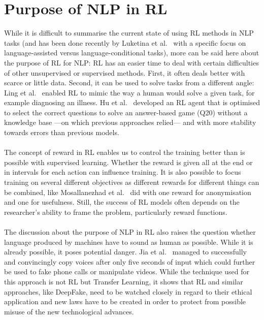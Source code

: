\documentclass[11pt]{article}
\begin{document}
\section{Purpose of NLP in RL}\label{purpose}
While it is difficult to summarise the current state of using RL methods in NLP tasks (and has been done recently by Luketina et al.~ with a specific focus on language-assisted versus language-conditional tasks), more can be said here about the purpose of RL for NLP: RL has an easier time to deal with certain difficulties of other unsupervised or supervised methods. First, it often deals better with scarce or little data. Second, it can be used to solve tasks from a different angle: Ling et al.~ enabled RL to mimic the way a human would solve a given task, for example diagnosing an illness. Hu et al.~ developed an RL agent that is optimised to select the correct questions to solve an answer-based game (Q20) without a knowledge base ---on which previous approaches relied--- and with more stability towards errors than previous models. \\\\
The concept of reward in RL enables us to control the training better than is possible with supervised learning. Whether the reward is given all at the end or in intervals for each action can influence training. It is also possible to focus training on several different objectives as different rewards for different things can be combined, like Mosallanezhad et al.~ did with one reward for anonymisation and one for usefulness. Still, the success of RL models often depends on the researcher's ability to frame the problem, particularly reward functions.\\\\
The discussion about the purpose of NLP in RL also raises the question whether language produced by machines have to sound as human as possible. While it is already possible, it poses potential danger. Jia et al.~ managed to successfully and convincingly copy voices after only five seconds of input which could further be used to fake phone calls or manipulate videos. While the technique used for this approach is not RL but Transfer Learning, it shows that RL and similar approaches, like DeepFake, need to be watched closely in regard to their ethical application and new laws have to be created in order to protect from possible misuse of the new technological advances. 
\end{document}
